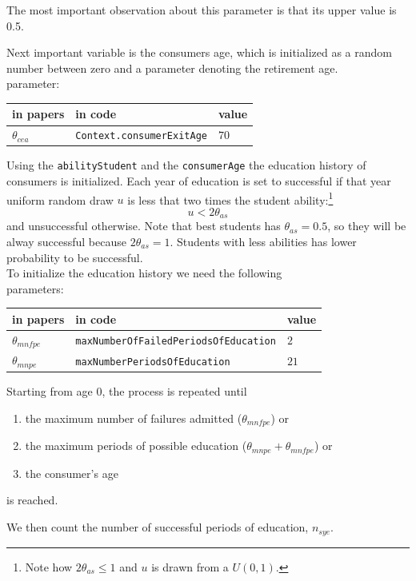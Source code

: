 \documentclass{book}
\begin{document}
\vskip5mm
The most important observation about this parameter is that its upper value is 0.5.

Next important variable is the consumers age, which is initialized as a random number between zero and a parameter denoting the retirement age.\\
parameter:\\
\begin{tabular}{l l l}
	\hline
	in papers& in code&value\\
	\hline
	\hline
 $\theta_{cea}$&\verb+Context.consumerExitAge+&$70$\\
	\hline
\end{tabular}

\vskip5mm
Using the \verb+abilityStudent+ and the \verb+consumerAge+ the education history of consumers is initialized. Each year of education is set to successful if that year uniform random draw $u$ is less that two times the student ability:\footnote{Note how $2\theta_{as}\le 1$ and $u$ is drawn from a $U(0,1)$.}
\[
	u<2\theta_{as}
\]
and unsuccessful otherwise.  Note that best students has $\theta_{as}=0.5$, so they will be alway successful because $2\theta_{as}=1$. Students with less abilities has lower probability to be successful.\\

To initialize the education history we need the following\\ 
parameters:\\
\begin{tabular}{l l l}
	\hline
	in papers& in code&value\\
	\hline
	\hline
 $\theta_{mnfpe}$&\verb+maxNumberOfFailedPeriodsOfEducation+&$2$\\
 $\theta_{mnpe}$&\verb+maxNumberPeriodsOfEducation+&$21$\\
	\hline
\end{tabular}

\vskip5mm
Starting from age 0, the process is repeated until 
\begin{enumerate}
	\item the maximum number of failures admitted ($\theta_{mnfpe}$) or
	\item the maximum periods of possible education ($\theta_{mnpe}+\theta_{mnfpe}$) or
	\item the consumer's age 
\end{enumerate}
is reached.

We then count the number of successful periods of education, $n_{sye}$. 
\end{document}
